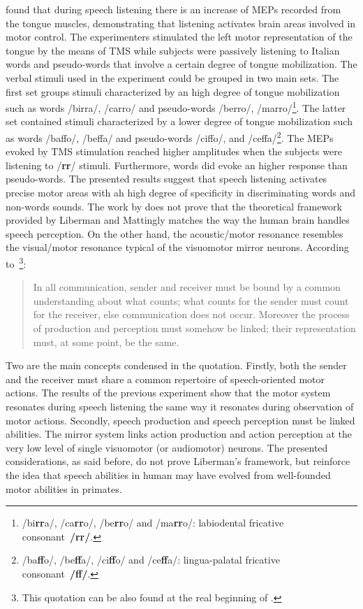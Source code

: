 \citet{fadiga.craighero.etal:2002} found that during speech listening there is
an increase of MEPs recorded from the tongue muscles, demonstrating that
listening activates brain areas involved in motor control.
The experimenters stimulated the left motor representation of the tongue by the
means of TMS while subjects were passively listening to Italian words and
pseudo-words that involve a certain degree of tongue mobilization.
The verbal stimuli used in the experiment could be grouped in two main sets.
The first set groups stimuli characterized by an high degree of tongue
mobilization such as words /birra/, /carro/ and pseudo-words /berro/,
/marro/\footnote{/bi\textbf{rr}a/, /ca\textbf{rr}o/, 
/be\textbf{rr}o/ and /ma\textbf{rr}o/: labiodental fricative
consonant~\textbf{/rr/}.}.
The latter set contained stimuli characterized by a lower degree of tongue
mobilization such as 
words /baffo/, /beffa/ and pseudo-words /ciffo/,
and /ceffa/\footnote{/ba\textbf{ff}o/, /be\textbf{ff}a/, 
/ci\textbf{ff}o/ and /ce\textbf{ff}a/: lingua-palatal fricative
consonant~\textbf{/ff/}.}.
The MEPs evoked by TMS stimulation reached higher amplitudes when the subjects
were listening to /\textbf{rr}/ stimuli. 
Furthermore, words did evoke an higher response than pseudo-words.
The presented results suggest that speech listening
activates precise motor areas with ah high degree of specificity in
discriminating words and non-words sounds.
The work by \citep{fadiga.craighero.etal:2002} does not prove that the
theoretical framework provided by Liberman and Mattingly matches the way the
human brain handles speech perception. On the other hand, the
acoustic/motor resonance resembles the visual/motor resonance typical of the
visuomotor mirror neurons.
According to~\citet{liberman:1993}\footnote{This quotation can be also found at
the real beginning of \citet{rizzolatti.arbib:1998}.}:
\begin{quote}
In all communication, sender and receiver must be bound by a common
understanding about what counts; what counts for the sender must count for the
receiver, else communication does not occur. Moreover the process of production
and perception must somehow be linked; their representation must, at some point,
be the same.
\end{quote}
Two are the main concepts condensed in the quotation. 
Firstly, both the sender and the receiver must share a common repertoire of
speech-oriented motor actions.
The results of the previous experiment show that the motor system resonates
during speech listening the same way it resonates during observation of motor 
actions.
Secondly, speech production and speech perception must be linked abilities. 
The mirror system links action production and action perception at the very low
level of single visuomotor (or audiomotor) neurons.
The presented considerations, as said before, do not prove Liberman's framework,
but reinforce the idea that speech abilities in human may have evolved from
well-founded motor abilities in primates.

